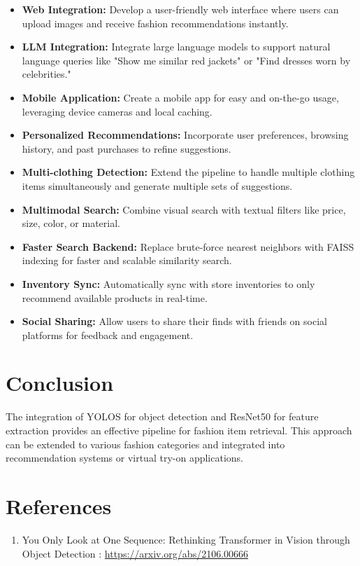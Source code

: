 \begin{itemize}
    \item \textbf{Web Integration:} Develop a user-friendly web interface where users can upload images and receive fashion recommendations instantly.
    \item \textbf{LLM Integration:} Integrate large language models to support natural language queries like "Show me similar red jackets" or "Find dresses worn by celebrities."
    \item \textbf{Mobile Application:} Create a mobile app for easy and on-the-go usage, leveraging device cameras and local caching.
    \item \textbf{Personalized Recommendations:} Incorporate user preferences, browsing history, and past purchases to refine suggestions.
    \item \textbf{Multi-clothing Detection:} Extend the pipeline to handle multiple clothing items simultaneously and generate multiple sets of suggestions.
    \item \textbf{Multimodal Search:} Combine visual search with textual filters like price, size, color, or material.
    \item \textbf{Faster Search Backend:} Replace brute-force nearest neighbors with FAISS indexing for faster and scalable similarity search.
    \item \textbf{Inventory Sync:} Automatically sync with store inventories to only recommend available products in real-time.
    \item \textbf{Social Sharing:} Allow users to share their finds with friends on social platforms for feedback and engagement.
\end{itemize}


\section*{Conclusion}
The integration of YOLOS for object detection and ResNet50 for feature extraction provides an effective pipeline for fashion item retrieval. This approach can be extended to various fashion categories and integrated into recommendation systems or virtual try-on applications.

\section*{References}
\begin{enumerate}
  \item You Only Look at One Sequence: Rethinking Transformer in Vision through Object Detection
  : \url{https://arxiv.org/abs/2106.00666}
\end{enumerate}